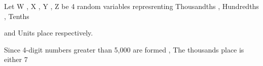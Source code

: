 \documentclass[journal,12pt,onecolumn]{IEEEtran}
\begin{document}


           


            



                
 Let W , X , Y , Z be 4 random variables represrenting Thousandths , Hundredths , Tenths 
 
 and Units place respectively.

 Since 4-digit numbers greater than 5,000 are formed , The thousands place is either 7 
           
\end{document}
